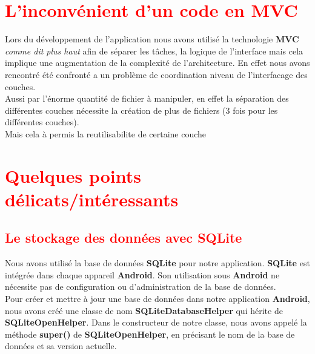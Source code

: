 \documentclass{article}
\begin{document}

\section{\textcolor{red}{L'inconvénient d'un code en MVC}}

Lors du développement de l'application nous avons utilisé la technologie \textbf{MVC} \textit{comme dit plus haut} afin de séparer les tâches, la logique de l'interface mais cela implique une augmentation de la complexité de l’architecture. En effet nous avons rencontré été confronté a un problème de coordination niveau de l'interfacage des couches.\\

Aussi par l'énorme quantité de fichier à manipuler, en effet la séparation des différentes couches nécessite la création de plus de fichiers (3 fois pour les différentes couches).\\

Mais cela à permis la reutilisabilite de certaine couche 


\section{\textcolor{red}{Quelques points délicats/intéressants}}

\subsection{\textcolor{red}{Le stockage des données avec SQLite}}

Nous avons utilisé la base de données \textbf{SQLite} pour notre application. \textbf{SQLite} est intégrée dans chaque appareil \textbf{Android}. Son utilisation sous \textbf{Android} ne nécessite pas de configuration ou d'administration de la base de données.\\

Pour créer et mettre à jour une base de données dans notre application \textbf{Android}, nous avons créé une classe de nom \textbf{SQLiteDatabaseHelper} qui hérite de \textbf{SQLiteOpenHelper}. Dans le constructeur de notre classe, nous avons appelé la méthode \textbf{super()} de \textbf{SQLiteOpenHelper}, en précisant le nom de la base de données et sa version actuelle.\\
\end{document}
